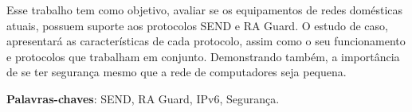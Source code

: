 \begin{resumo}[RESUMO]	
Esse trabalho tem como objetivo, avaliar se os equipamentos de redes domésticas atuais, possuem suporte aos protocolos SEND e RA Guard. O estudo de caso, apresentará as características de cada protocolo, assim como o seu funcionamento e protocolos que trabalham em conjunto. Demonstrando também, a importância de se ter segurança mesmo que a rede de computadores seja pequena.


 \vspace{\onelineskip}
    
 \noindent
 \textbf{Palavras-chaves}: SEND, RA Guard, IPv6, Segurança.
\end{resumo}
